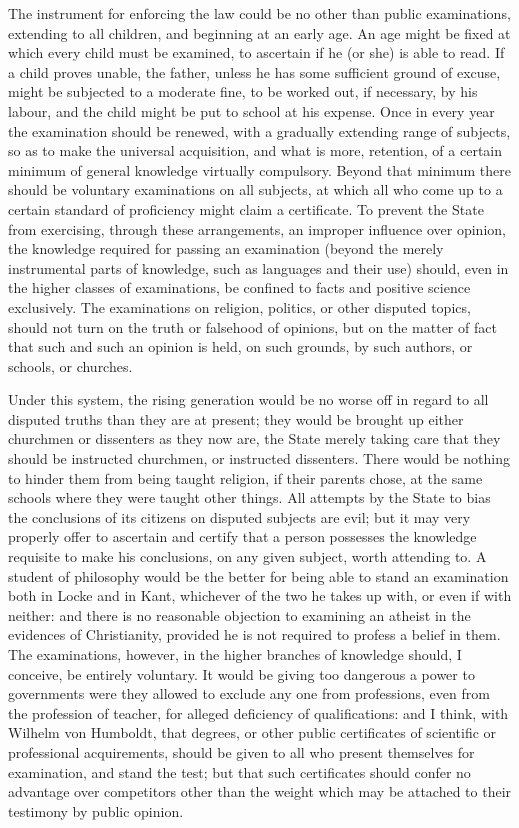 \documentclass[11pt,openany]{book}
\begin{document}
The instrument for enforcing the law could be no other than public examinations, extending to all children, and beginning at an early age. An age might be fixed at which every child must be examined, to ascertain if he (or she) is able to read. If a child proves unable, the father, unless he has some sufficient ground of excuse, might be subjected to a moderate fine, to be worked out, if necessary, by his labour, and the child might be put to school at his expense. Once in every year the examination should be renewed, with a gradually extending range of subjects, so as to make the universal acquisition, and what is more, retention, of a certain minimum of general knowledge virtually compulsory. Beyond that minimum there should be voluntary examinations on all subjects, at which all who come up to a certain standard of proficiency might claim a certificate. To prevent the State from exercising, through these arrangements, an improper influence over opinion, the knowledge required for passing an examination (beyond the merely instrumental parts of knowledge, such as languages and their use) should, even in the higher classes of examinations, be confined to facts and positive science exclusively. The examinations on religion, politics, or other disputed topics, should not turn on the truth or falsehood of opinions, but on the matter of fact that such and such an opinion is held, on such grounds, by such authors, or schools, or churches.

Under this system, the rising generation would be no worse off in regard to all disputed truths than they are at present; they would be brought up either churchmen or dissenters as they now are, the State merely taking care that they should be instructed churchmen, or instructed dissenters. There would be nothing to hinder them from being taught religion, if their parents chose, at the same schools where they were taught other things. All attempts by the State to bias the conclusions of its citizens on disputed subjects are evil; but it may very properly offer to ascertain and certify that a person possesses the knowledge requisite to make his conclusions, on any given subject, worth attending to. A student of philosophy would be the better for being able to stand an examination both in Locke and in Kant, whichever of the two he takes up with, or even if with neither: and there is no reasonable objection to examining an atheist in the evidences of Christianity, provided he is not required to profess a belief in them. The examinations, however, in the higher branches of knowledge should, I conceive, be entirely voluntary. It would be giving too dangerous a power to governments were they allowed to exclude any one from professions, even from the profession of teacher, for alleged deficiency of qualifications: and I think, with Wilhelm von Humboldt, that degrees, or other public certificates of scientific or professional acquirements, should be given to all who present themselves for examination, and stand the test; but that such certificates should confer no advantage over competitors other than the weight which may be attached to their testimony by public opinion.
\end{document}
